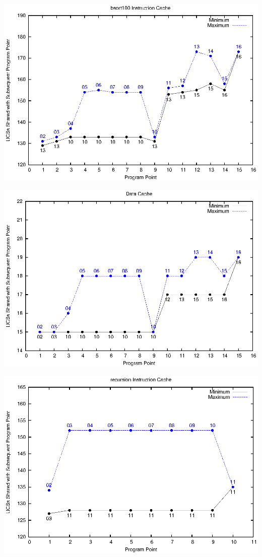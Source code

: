 \documentclass[12pt]{article}
\begin{document}
\includegraphics{eps/bsort-icache.eps}

\includegraphics{eps/bsort-dcache.eps}

\includegraphics{eps/recursion-icache.eps}
\end{document}
